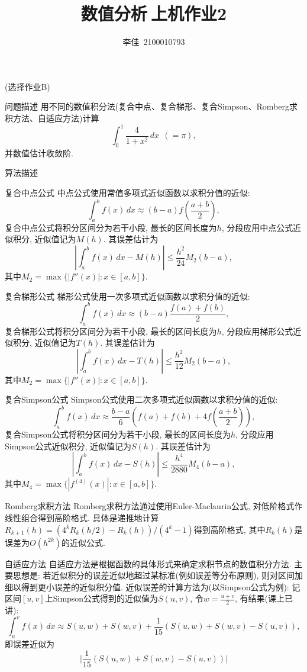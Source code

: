 \documentclass{article}
\title{\textbf{数值分析$\ $上机作业2}}
\author{李佳~2100010793}
\date{}
\begin{document}
\maketitle
(选择作业B)
\begin{section}{问题描述}
    用不同的数值积分法(复合中点、复合梯形、复合Simpson、Romberg求积方法、自适应方法)计算
    $$\int_0^1\frac{4}{1+x^2}\,dx\ \ (=\pi),$$
    并数值估计收敛阶.
\end{section}
\begin{section}{算法描述}
\begin{subsection}{复合中点公式}
    中点公式使用常值多项式近似函数以求积分值的近似:
    $$\int_a^b f(x)\,dx \approx (b-a)f(\frac{a+b}{2}),$$
    复合中点公式将积分区间分为若干小段, 最长的区间长度为$h$, 分段应用中点公式近似积分, 近似值记为$M(h)$. 其误差估计为
    $$|\int_a^b f(x)\,dx - M(h)|\leq \frac{h^2}{24}M_2(b-a),$$
    其中$M_2=\max\{|f''(x)|:x\in[a,b]\}$.
\end{subsection}
\begin{subsection}{复合梯形公式}
    梯形公式使用一次多项式近似函数以求积分值的近似:
    $$\int_a^b f(x)\,dx \approx (b-a)\frac{f(a)+f(b)}{2},$$
    复合梯形公式将积分区间分为若干小段, 最长的区间长度为$h$, 分段应用梯形公式近似积分, 近似值记为$T(h)$. 其误差估计为
    $$|\int_a^b f(x)\,dx - T(h)|\leq \frac{h^2}{12}M_2(b-a),$$
    其中$M_2=\max\{|f''(x)|:x\in[a,b]\}$.
\end{subsection}
\begin{subsection}{复合Simpson公式}
    Simpson公式使用二次多项式近似函数以求积分值的近似:
    $$\int_a^b f(x)\,dx \approx \frac{b-a}{6}(f(a) + f(b) + 4f(\frac{a+b}{2})),$$
    复合Simpson公式将积分区间分为若干小段, 最长的区间长度为$h$, 分段应用Simpson公式近似积分, 近似值记为$S(h)$. 其误差估计为
    $$|\int_a^b f(x)\,dx - S(h)|\leq \frac{h^4}{2880}M_4(b-a),$$
    其中$M_4=\max\{|f^{(4)}(x)|:x\in[a,b]\}$.
\end{subsection}
\begin{subsection}{Romberg求积方法}
    Romberg求积方法通过使用Euler-Maclaurin公式, 对低阶格式作线性组合得到高阶格式. 
    具体是递推地计算$R_{k+1}(h)=(4^{k}R_{k}(h/2)-R_{k}(h))/(4^{k}-1)$得到高阶格式, 
    其中$R_k(h)$是误差为$O(h^{2k})$的近似公式.
\end{subsection}
\begin{subsection}{自适应方法}
    自适应方法是根据函数的具体形式来确定求积节点的数值积分方法. 主要思想是: 若近似积分的误差近似地超过某标准(例如误差等分布原则), 则对区间加细以得到更小误差的近似积分值. 
    近似误差的计算方法为(以Simpson公式为例): 记区间$[u,v]$上Simpson公式得到的近似值为$S(u,v)$, 令$w=\frac{u+v}{2}$, 有结果(课上已讲):
    $$\int_u^v f(x)\,dx\approx S(u,w)+S(w,v) + \frac{1}{15}(S(u,w)+S(w,v)-S(u,v)),$$
    即误差近似为\begin{equation}\bigg|\frac{1}{15}(S(u,w)+S(w,v)-S(u,v))\bigg|\label{error}\end{equation}
    

\end{subsection}
\end{section}
\end{document}
